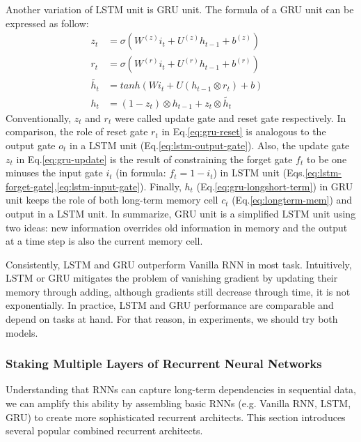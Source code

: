 Another variation of LSTM unit is GRU unit\cite{GRU}. 
The formula of a  GRU unit can be expressed as follow\cite{colah-lsmt}:
\begin{align}
	z_t &= \sigma(W^{(z)}i_t + U^{(z)}h_{t-1} + b^{(z)}) \label{eq:gru-update}&\\ 
  	r_t &= \sigma(W^{(r)}i_t + U^{(r)}h_{t-1} + b^{(r)}) \label{eq:gru-reset}&\\ 
  	\tilde{h_t} &= tanh(Wi_t + U(h_{t-1} \otimes r_t) + b) &\\
  	h_t &= (1-z_t) \otimes h_{t-1} + z_t \otimes \tilde{h_t} \label{eq:gru-longshort-term}&
\end{align}
Conventionally, \(z_t\) and \(r_t\) were called update gate and reset gate respectively\cite{GRU}. 
In comparison, the role of reset gate \(r_t\) in Eq.\ref{eq:gru-reset} is analogous to the output gate \(o_t\) in a LSTM unit (Eq.\ref{eq:lstm-output-gate}).  
Also, the update gate \(z_t\) in Eq.\ref{eq:gru-update} is the result of constraining the forget gate \(f_t\) to be one minuses the input gate \(i_t\) (in formula: \(f_t = 1-i_t\)) in LSTM unit (Eqs.\ref{eq:lstm-forget-gate},\ref{eq:lstm-input-gate}).
Finally, \(h_t\) (Eq.\ref{eq:gru-longshort-term}) in GRU unit keeps the role of both long-term memory cell \(c_t\) (Eq.\ref{eq:longterm-mem}) and output in a LSTM unit. 
In summarize, GRU unit is a simplified LSTM unit using two ideas: new information overrides old information in memory and the output at a time step is also the current memory cell\cite{evaluate-GRU}.  

Consistently, LSTM and GRU outperform Vanilla RNN in most task. 
Intuitively, LSTM or GRU mitigates the problem of vanishing gradient by updating their memory through adding\cite{evaluate-GRU}, although gradients still decrease through time, it is not exponentially\cite{Graves-thesis}. 
In practice, LSTM and GRU performance are comparable and depend on tasks at hand\cite{understand-lstm}\cite{evaluate-GRU}\cite{lstm-search}. 
For that reason, in experiments, we should try both models. 

\subsubsection{Staking Multiple Layers of Recurrent Neural Networks}
Understanding that RNNs can capture long-term dependencies in sequential data, we can amplify this ability by assembling basic RNNs (e.g. Vanilla RNN, LSTM, GRU) to create more sophisticated recurrent architects.
This section introduces several popular combined recurrent architects.
 
